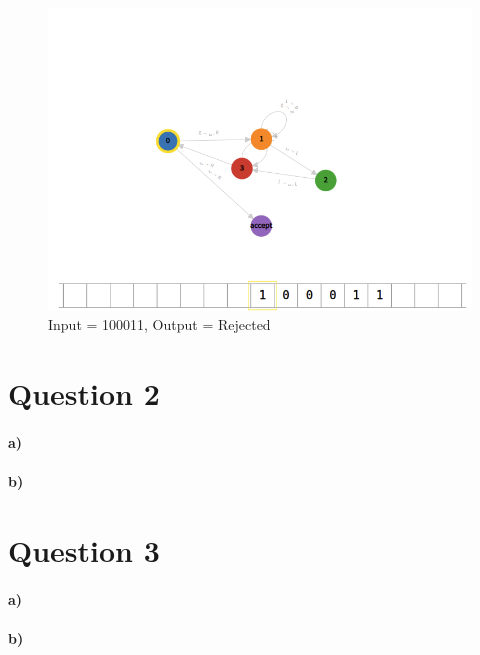 \documentclass[12pt]{article}
\begin{document}
\begin{figure}[bp!]
    \caption{Input = 100011, Output = Rejected}
    \centering
    \includegraphics[width=12cm]{Q1/100011o.png}
\end{figure}
\newpage
\newpage
\newpage
\section*{Question 2}
\paragraph{a)}
\paragraph{b)}

\section*{Question 3}
\paragraph{a)}
\paragraph{b)}
\end{document}
